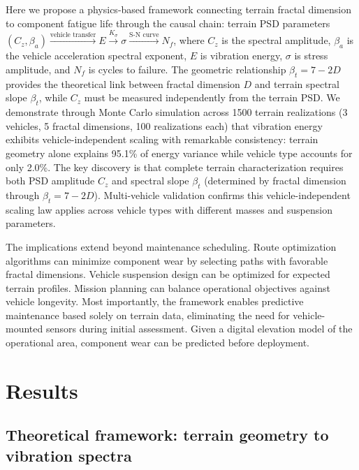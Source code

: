 \documentclass[11pt]{article}
\begin{document}
Here we propose a physics-based framework connecting terrain fractal dimension to component fatigue life through the causal chain: terrain PSD parameters $(C_z, \beta_a) \xrightarrow{\text{vehicle transfer}} E \xrightarrow{K_\sigma} \sigma \xrightarrow{\text{S-N curve}} N_f$, where $C_z$ is the spectral amplitude, $\beta_a$ is the vehicle acceleration spectral exponent, $E$ is vibration energy, $\sigma$ is stress amplitude, and $N_f$ is cycles to failure. The geometric relationship $\beta_t = 7-2D$ provides the theoretical link between fractal dimension $D$ and terrain spectral slope $\beta_t$, while $C_z$ must be measured independently from the terrain PSD. We demonstrate through Monte Carlo simulation across 1500 terrain realizations (3 vehicles, 5 fractal dimensions, 100 realizations each) that vibration energy exhibits vehicle-independent scaling with remarkable consistency: terrain geometry alone explains 95.1\% of energy variance while vehicle type accounts for only 2.0\%. The key discovery is that complete terrain characterization requires both PSD amplitude $C_z$ and spectral slope $\beta_t$ (determined by fractal dimension through $\beta_t = 7-2D$). Multi-vehicle validation confirms this vehicle-independent scaling law applies across vehicle types with different masses and suspension parameters.

The implications extend beyond maintenance scheduling. Route optimization algorithms can minimize component wear by selecting paths with favorable fractal dimensions. Vehicle suspension design can be optimized for expected terrain profiles. Mission planning can balance operational objectives against vehicle longevity. Most importantly, the framework enables predictive maintenance based solely on terrain data, eliminating the need for vehicle-mounted sensors during initial assessment. Given a digital elevation model of the operational area, component wear can be predicted before deployment.


\section*{Results}

\subsection*{Theoretical framework: terrain geometry to vibration spectra}
\end{document}
